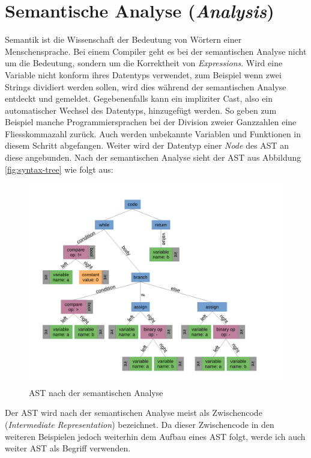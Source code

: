 \section{Semantische Analyse (\textit{Analysis})}
Semantik ist die Wissenschaft der Bedeutung von Wörtern einer Menschensprache. Bei einem Compiler geht es bei der semantischen Analyse nicht um die Bedeutung, sondern um die Korrektheit von \textit{Expressions}.
Wird eine Variable nicht konform ihres Datentyps verwendet, zum Beispiel wenn zwei Strings dividiert werden sollen, wird dies während der semantischen Analyse entdeckt und gemeldet.
Gegebenenfalls kann ein impliziter Cast, also ein automatischer Wechsel des Datentyps, hinzugefügt werden.
So geben zum Beispiel manche Programmiersprachen bei der Division zweier Ganzzahlen eine Fliesskommazahl zurück.
Auch werden unbekannte Variablen und Funktionen in diesem Schritt abgefangen.
Weiter wird der Datentyp einer \textit{Node} des AST an diese angebunden. Nach der semantischen Analyse sieht der AST aus Abbildung \ref{fig:syntax-tree} wie folgt aus:

\begin{figure}[H]
    \centering
    \includegraphics[scale=0.4]{resources/images/AST_with_types.pdf}
    \caption[AST nach der semantischen Analyse (Basierend auf Abbildung \ref{fig:syntax-tree})]{AST nach der semantischen Analyse}
    \label{fig:syntax-tree-with-types}
\end{figure}

Der AST wird nach der semantischen Analyse meist als Zwischencode (\textit{Intermediate Representation}) bezeichnet.
Da dieser Zwischencode in den weiteren Beispielen jedoch weiterhin dem Aufbau eines AST folgt, werde ich auch weiter AST als Begriff verwenden.


